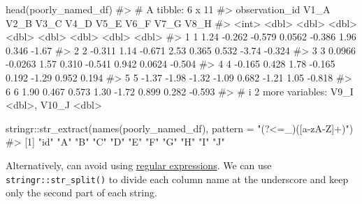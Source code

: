\documentclass[
  letterpaper,
  DIV=11,
  numbers=noendperiod]{scrreprt}
\newenvironment{Shaded}{\begin{snugshade}}{\end{snugshade}}
\newcommand{\AttributeTok}[1]{\textcolor[rgb]{0.40,0.45,0.13}{#1}}
\newcommand{\CommentTok}[1]{\textcolor[rgb]{0.37,0.37,0.37}{#1}}
\newcommand{\FunctionTok}[1]{\textcolor[rgb]{0.28,0.35,0.67}{#1}}
\newcommand{\NormalTok}[1]{\textcolor[rgb]{0.00,0.23,0.31}{#1}}
\newcommand{\SpecialCharTok}[1]{\textcolor[rgb]{0.37,0.37,0.37}{#1}}
\newcommand{\StringTok}[1]{\textcolor[rgb]{0.13,0.47,0.30}{#1}}
\begin{document}
\begin{Shaded}
\begin{Highlighting}[]
\FunctionTok{head}\NormalTok{(poorly\_named\_df)}
\CommentTok{\#\textgreater{} \# A tibble: 6 x 11}
\CommentTok{\#\textgreater{}   observation\_id    V1\_A    V2\_B   V3\_C    V4\_D   V5\_E   V6\_F    V7\_G   V8\_H}
\CommentTok{\#\textgreater{}            \textless{}int\textgreater{}   \textless{}dbl\textgreater{}   \textless{}dbl\textgreater{}  \textless{}dbl\textgreater{}   \textless{}dbl\textgreater{}  \textless{}dbl\textgreater{}  \textless{}dbl\textgreater{}   \textless{}dbl\textgreater{}  \textless{}dbl\textgreater{}}
\CommentTok{\#\textgreater{} 1              1  1.24   {-}0.262  {-}0.579  0.0562 {-}0.386  1.96   0.346  {-}1.67 }
\CommentTok{\#\textgreater{} 2              2 {-}0.311   1.14   {-}0.671  2.53    0.365  0.532 {-}3.74   {-}0.324}
\CommentTok{\#\textgreater{} 3              3  0.0966 {-}0.0263  1.57   0.310  {-}0.541  0.942  0.0624 {-}0.504}
\CommentTok{\#\textgreater{} 4              4 {-}0.165   0.428   1.78  {-}0.165   0.192 {-}1.29   0.952   0.194}
\CommentTok{\#\textgreater{} 5              5 {-}1.37   {-}1.98   {-}1.32  {-}1.09    0.682 {-}1.21   1.05   {-}0.818}
\CommentTok{\#\textgreater{} 6              6  1.90    0.467   0.573  1.30   {-}1.72   0.899  0.282  {-}0.593}
\CommentTok{\#\textgreater{} \# i 2 more variables: V9\_I \textless{}dbl\textgreater{}, V10\_J \textless{}dbl\textgreater{}}
\end{Highlighting}
\end{Shaded}

\begin{Shaded}
\begin{Highlighting}[]
\NormalTok{stringr}\SpecialCharTok{::}\FunctionTok{str\_extract}\NormalTok{(}\FunctionTok{names}\NormalTok{(poorly\_named\_df), }\AttributeTok{pattern =} \StringTok{"(?\textless{}=\_)([a{-}zA{-}Z]+)"}\NormalTok{)}
\CommentTok{\#\textgreater{}  [1] "id" "A"  "B"  "C"  "D"  "E"  "F"  "G"  "H"  "I"  "J"}
\end{Highlighting}
\end{Shaded}

Alternatively, can avoid using
\href{https://en.wikipedia.org/wiki/Regular_expression}{regular
expressions}. We can use \texttt{stringr::str\_split()} to divide each
column name at the underscore and keep only the second part of each
string.
\end{document}

